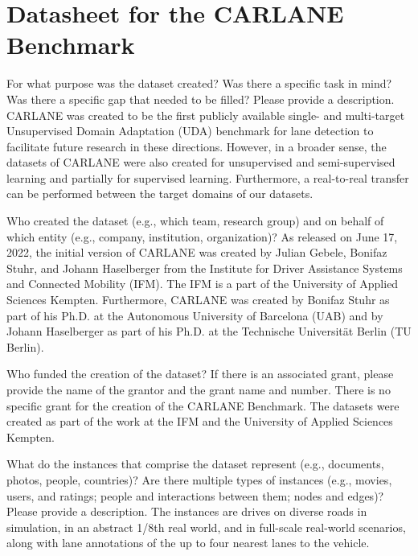 \documentclass{article}
\begin{document}
\section{Datasheet for the CARLANE Benchmark}
	\begin{datasheetitem}{For what purpose was the dataset created? \normalfont Was there a specific task in mind? Was there a specific gap that needed to be filled? Please provide a description.}
		CARLANE was created to be the first publicly available single- and multi-target Unsupervised Domain Adaptation (UDA) benchmark for lane detection to facilitate future research in these directions. However, in a broader sense, the datasets of CARLANE were also created for unsupervised and semi-supervised learning and partially for supervised learning. Furthermore, a real-to-real transfer can be performed between the target domains of our datasets.
	\end{datasheetitem}
	\begin{datasheetitem}{Who created the dataset (e.g., which team, research group) and on behalf of which entity (e.g., company, institution, organization)?}
		As released on June 17, 2022, the initial version of CARLANE was created by Julian Gebele, Bonifaz Stuhr, and Johann Haselberger from the Institute for Driver Assistance Systems and Connected Mobility (IFM). The IFM is a part of the University of Applied Sciences Kempten. Furthermore, CARLANE was created by Bonifaz Stuhr as part of his Ph.D. at the Autonomous University of Barcelona (UAB) and by Johann Haselberger as part of his Ph.D. at the Technische Universität Berlin (TU Berlin).
	\end{datasheetitem}
	\begin{datasheetitem}{Who funded the creation of the dataset? \normalfont If there is an associated grant, please provide the name of the grantor and the grant name and number.}
		There is no specific grant for the creation of the CARLANE Benchmark. The datasets were created as part of the work at the IFM and the University of Applied Sciences Kempten.
	\end{datasheetitem}
	\begin{datasheetitem}{What do the instances that comprise the dataset represent (e.g., documents, photos, people, countries)? \normalfont Are there multiple types of instances (e.g., movies, users, and ratings; people and interactions between them; nodes and edges)? Please provide a description.}
		The instances are drives on diverse roads in simulation, in an abstract 1/8th real world, and in full-scale real-world scenarios, along with lane annotations of the up to four nearest lanes to the vehicle.
	\end{datasheetitem}
\end{document}

